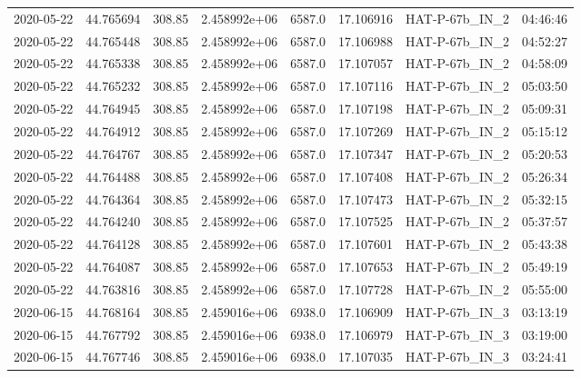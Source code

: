 \documentclass{aastex631}
\begin{document}
\begin{tabular}{lrrrlrll}
    2020-05-22 & 44.765694   & 308.85        & 2.458992e+06 & 6587.0 & 17.106916 & HAT-P-67b\_IN\_2           & 04:46:46 \\
    2020-05-22 & 44.765448   & 308.85        & 2.458992e+06 & 6587.0 & 17.106988 & HAT-P-67b\_IN\_2           & 04:52:27 \\
    2020-05-22 & 44.765338   & 308.85        & 2.458992e+06 & 6587.0 & 17.107057 & HAT-P-67b\_IN\_2           & 04:58:09 \\
    2020-05-22 & 44.765232   & 308.85        & 2.458992e+06 & 6587.0 & 17.107116 & HAT-P-67b\_IN\_2           & 05:03:50 \\
    2020-05-22 & 44.764945   & 308.85        & 2.458992e+06 & 6587.0 & 17.107198 & HAT-P-67b\_IN\_2           & 05:09:31 \\
    2020-05-22 & 44.764912   & 308.85        & 2.458992e+06 & 6587.0 & 17.107269 & HAT-P-67b\_IN\_2           & 05:15:12 \\
    2020-05-22 & 44.764767   & 308.85        & 2.458992e+06 & 6587.0 & 17.107347 & HAT-P-67b\_IN\_2           & 05:20:53 \\
    2020-05-22 & 44.764488   & 308.85        & 2.458992e+06 & 6587.0 & 17.107408 & HAT-P-67b\_IN\_2           & 05:26:34 \\
    2020-05-22 & 44.764364   & 308.85        & 2.458992e+06 & 6587.0 & 17.107473 & HAT-P-67b\_IN\_2           & 05:32:15 \\
    2020-05-22 & 44.764240   & 308.85        & 2.458992e+06 & 6587.0 & 17.107525 & HAT-P-67b\_IN\_2           & 05:37:57 \\
    2020-05-22 & 44.764128   & 308.85        & 2.458992e+06 & 6587.0 & 17.107601 & HAT-P-67b\_IN\_2           & 05:43:38 \\
    2020-05-22 & 44.764087   & 308.85        & 2.458992e+06 & 6587.0 & 17.107653 & HAT-P-67b\_IN\_2           & 05:49:19 \\
    2020-05-22 & 44.763816   & 308.85        & 2.458992e+06 & 6587.0 & 17.107728 & HAT-P-67b\_IN\_2           & 05:55:00 \\
    2020-06-15 & 44.768164   & 308.85        & 2.459016e+06 & 6938.0 & 17.106909 & HAT-P-67b\_IN\_3           & 03:13:19 \\
    2020-06-15 & 44.767792   & 308.85        & 2.459016e+06 & 6938.0 & 17.106979 & HAT-P-67b\_IN\_3           & 03:19:00 \\
    2020-06-15 & 44.767746   & 308.85        & 2.459016e+06 & 6938.0 & 17.107035 & HAT-P-67b\_IN\_3           & 03:24:41 \\

\end{tabular}
\end{document}

